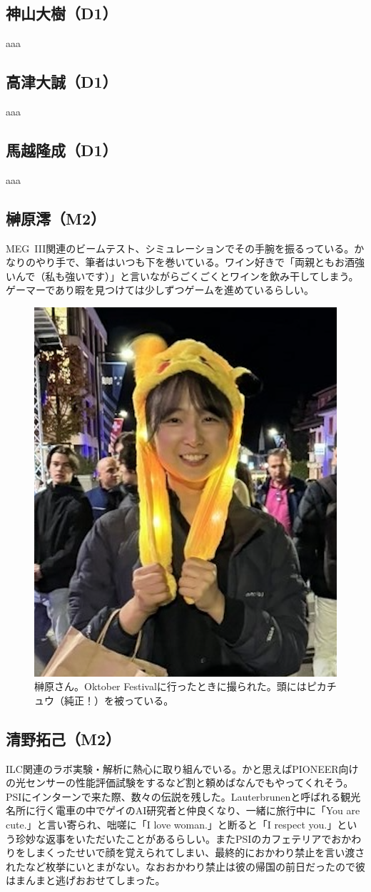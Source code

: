 \subsection{神山大樹（D1）}
aaa

\subsection{高津大誠（D1）}
aaa

\subsection{馬越隆成（D1）}
aaa

\subsection{榊原澪（M2）}

MEG~III関連のビームテスト、シミュレーションでその手腕を振るっている。かなりのやり手で、筆者はいつも下を巻いている。ワイン好きで「両親ともお酒強いんで（私も強いです）」と言いながらごくごくとワインを飲み干してしまう。%
ゲーマーであり暇を見つけては少しずつゲームを進めているらしい。

\begin{figure}
  \vspace*{-\intextsep}
  \centering
  \includegraphics[width=0.3\columnwidth]{fig/rei.png}
  \caption{榊原さん。Oktober Festivalに行ったときに撮られた。頭にはピカチュウ（純正！）を被っている。}
  \label{fig:rei}
\end{figure}

\subsection{清野拓己（M2）}
ILC関連のラボ実験・解析に熱心に取り組んでいる。かと思えばPIONEER向けの光センサーの性能評価試験をするなど割と頼めばなんでもやってくれそう。PSIにインターンで来た際、数々の伝説を残した。Lauterbrunenと呼ばれる観光名所に行く電車の中でゲイのAI研究者と仲良くなり、一緒に旅行中に「You are cute.」と言い寄られ、咄嗟に「I love woman.」と断ると「I respect you.」という珍妙な返事をいただいたことがあるらしい。またPSIのカフェテリアでおかわりをしまくったせいで顔を覚えられてしまい、最終的におかわり禁止を言い渡されたなど枚挙にいとまがない。なおおかわり禁止は彼の帰国の前日だったので彼はまんまと逃げおおせてしまった。

